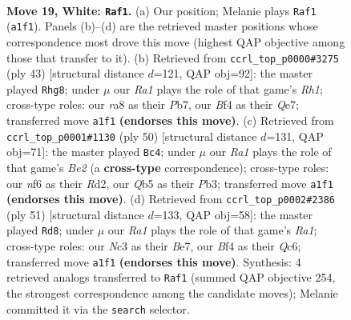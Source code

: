 \documentclass[11pt]{article}
\begin{document}
\clearpage

\begin{figure}[p]\centering
\begin{subfigure}{0.46\textwidth}\centering
\resizebox{\linewidth}{!}{%
\newchessgame
\chessboard[
  setfen={rn1q1b1r/4kp2/3p1np1/1QpP4/4PB2/1PN4N/P2K4/R6R w - - 1 19},
  showmover=false,
  pgfstyle=straightmove, color=movearrow, markmove={a1-f1}
]}
\caption{}
\end{subfigure}\hfill
\begin{subfigure}{0.46\textwidth}\centering
\resizebox{\linewidth}{!}{%
\newchessgame
\chessboard[
  setfen={1k1r3r/1p2q1pp/2n2p2/p2b3N/5P1P/2Q1P3/1P1RBKP1/R7 b - - 5 22},
  showmover=false,
  pgfstyle=straightmove, color=movearrow, markmove={h8-g8}
]}
\caption{}
\end{subfigure}
\\[4pt]
\begin{subfigure}{0.46\textwidth}\centering
\resizebox{\linewidth}{!}{%
\newchessgame
\chessboard[
  setfen={r2bn1rk/1p3p1p/4qP2/p2np3/P3N2Q/1P5P/3RB1P1/5R1K w - - 1 26},
  showmover=false,
  pgfstyle=straightmove, color=movearrow, markmove={e2-c4}
]}
\caption{}
\end{subfigure}\hfill
\begin{subfigure}{0.46\textwidth}\centering
\resizebox{\linewidth}{!}{%
\newchessgame
\chessboard[
  setfen={r5k1/4b1p1/2q2n1p/p7/1p2p1P1/7P/PPPNQ3/1KB1R3 b - - 5 26},
  showmover=false,
  pgfstyle=straightmove, color=movearrow, markmove={a8-d8}
]}
\caption{}
\end{subfigure}
\caption{\textbf{Move 19, White: \texttt{Raf1}.} (a) Our position; Melanie plays \texttt{Raf1} (\texttt{a1f1}). Panels (b)--(d) are the retrieved master positions whose correspondence most drove this move (highest QAP objective among those that transfer to it). (b) Retrieved from \texttt{ccrl\_top\_p0000\#3275} (ply 43) [structural distance $d$=121, QAP obj=92]: the master played \texttt{Rhg8}; under $\mu$ our \emph{Ra1} plays the role of that game's \emph{Rh1}; cross-type roles: our \emph{r}a8 as their \emph{P}b7, our \emph{B}f4 as their \emph{Q}e7; transferred move \texttt{a1f1} \textbf{(endorses this move)}. (c) Retrieved from \texttt{ccrl\_top\_p0001\#1130} (ply 50) [structural distance $d$=131, QAP obj=71]: the master played \texttt{Bc4}; under $\mu$ our \emph{Ra1} plays the role of that game's \emph{Be2} (a \textbf{cross-type} correspondence); cross-type roles: our \emph{n}f6 as their \emph{R}d2, our \emph{Q}b5 as their \emph{P}b3; transferred move \texttt{a1f1} \textbf{(endorses this move)}. (d) Retrieved from \texttt{ccrl\_top\_p0002\#2386} (ply 51) [structural distance $d$=133, QAP obj=58]: the master played \texttt{Rd8}; under $\mu$ our \emph{Ra1} plays the role of that game's \emph{Ra1}; cross-type roles: our \emph{N}c3 as their \emph{B}e7, our \emph{B}f4 as their \emph{Q}c6; transferred move \texttt{a1f1} \textbf{(endorses this move)}. Synthesis: 4 retrieved analogs transferred to \texttt{Raf1} (summed QAP objective 254, the strongest correspondence among the candidate moves); Melanie committed it via the \texttt{search} selector.}
\label{fig:thought-m36}
\end{figure}
\end{document}
